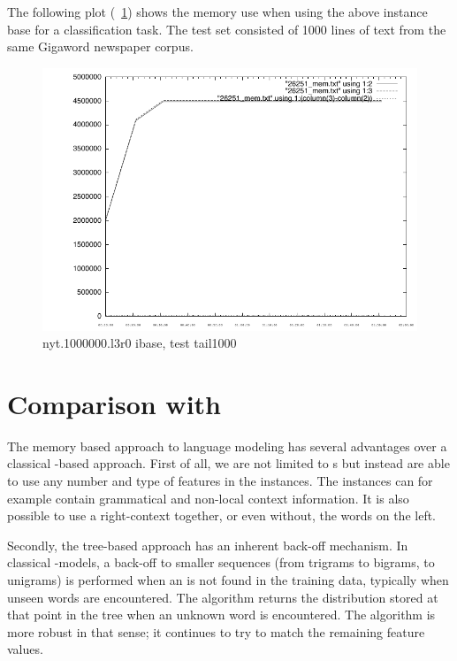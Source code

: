 \documentclass[a4paper,10pt,twoside]{report}
\begin{document}
The following plot (\figurename~\ref{fig:26251_mem.pdf}) shows the
memory use when using the above instance base for a classification
task. The test set consisted of \num{1000} lines of text from the same
Gigaword newspaper corpus.

\begin{figure}[!ht]
  \centering
  \includegraphics[width=\pdfwidth]{26251_mem.pdf}
 \caption{nyt.1000000.l3r0 ibase, test tail1000}
  \label{fig:26251_mem.pdf}
\end{figure}

\section{Comparison with \srilm{}}

The memory based approach to language modeling has several advantages
over a classical \ngram{}-based approach. First of all, we are not
limited to \ngram{}s but instead are able to use any number and type
of features in the instances. The instances can for example contain
grammatical and non-local context information. It is also possible to
use a right-context together, or even without, the words on the
left. 

Secondly, the tree-based approach has an inherent back-off
mechanism. In classical \ngram{}-models, a back-off to smaller
sequences (from trigrams to bigrams, to unigrams) is performed
when an \ngram{} is not found in the training data, typically when
unseen words are encountered. The \igtree{} algorithm returns the
distribution stored at that point in the tree when an unknown word is
encountered. The \triblt{} algorithm is more robust in that sense; it
continues to try to match the remaining feature values. 
\end{document}
